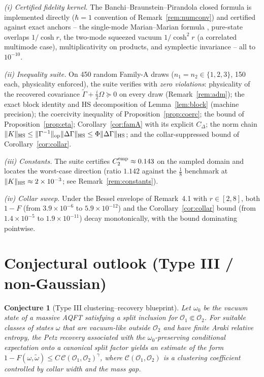 \documentclass[11pt]{article}
\newtheorem{conjecture}[theorem]{Conjecture}
\theoremstyle{remark}
\newcommand{\HS}{{\rm HS}}
\newcommand{\op}{{\rm op}}
\begin{document}
\emph{(i) Certified fidelity kernel.} The Banchi--Braunstein--Pirandola
closed formula \cite{BBP} is implemented directly ($\hbar = 1$ convention
of Remark~\ref{rem:numconv}) and certified against exact anchors -- the
single-mode Marian--Marian formula \cite{Marian}, pure-state overlaps
$1/\cosh r$, the two-mode squeezed vacuum $1/\cosh^2 r$ (a correlated
multimode case), multiplicativity on products, and symplectic invariance --
all to $10^{-10}$.

\emph{(ii) Inequality suite.} On 450 random Family-A draws
($n_1 = n_2 \in \{1,2,3\}$, 150 each, physicality enforced), the suite
verifies with \emph{zero violations}: physicality of the recovered covariance
$\tilde\Gamma + \frac{i}{2}\Omega \succeq 0$ on every draw
(Remark~\ref{rem:adm}); the exact block identity and HS
decomposition of Lemma~\ref{lem:block} (machine precision); the coercivity
inequality of Proposition~\ref{prop:coerc}; the bound of
Proposition~\ref{prop:eta}; Corollary~\ref{cor:famA} with its explicit
$C_\Delta$; the norm chain
$\|K\|_\HS \le \|\Gamma^{-1}\|_\op\|\Delta\Gamma\|_\HS \le
\Phi\|\Delta\Gamma\|_\HS$; and the collar-suppressed bound of
Corollary~\ref{cor:collar}.

\emph{(iii) Constants.} The suite certifies
$C_2^{\rm emp} \approx 0.143$ on the sampled domain and locates the
worst-case direction (ratio $1.142$ against the $\frac18$ benchmark at
$\|K\|_\HS \approx 2\times 10^{-3}$; see Remark~\ref{rem:constants}).

\emph{(iv) Collar sweep.} Under the Bessel envelope of
Remark~4.1
with $r \in [2, 8]$, both $1 - F$ (from $3.9\times 10^{-6}$ to
$5.9\times 10^{-12}$) and the Corollary~\ref{cor:collar} bound (from
$1.4\times 10^{-5}$ to $1.9\times 10^{-11}$) decay monotonically, with the
bound dominating pointwise.

\section{Conjectural outlook (Type III / non-Gaussian)}
\begin{conjecture}[Type III clustering--recovery blueprint]
\label{conj:t3}
Let $\omega_0$ be the vacuum state of a massive AQFT satisfying a split
inclusion for $\mathcal{O}_1 \Subset \mathcal{O}_2$. For suitable classes
of states $\omega$ that are vacuum-like outside $\mathcal{O}_2$ and have
finite Araki relative entropy, the Petz recovery associated with the
$\omega_0$-preserving conditional expectation onto a canonical split factor
yields an estimate of the form
$1 - F(\omega, \tilde\omega) \le C\, \mathcal{C}(\mathcal{O}_1,
\mathcal{O}_2)^\gamma$, where $\mathcal{C}(\mathcal{O}_1,\mathcal{O}_2)$ is
a clustering coefficient controlled by collar width and the mass gap.
\end{conjecture}
\end{document}
